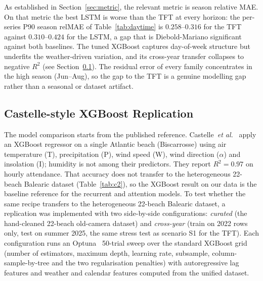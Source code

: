 \documentclass[twocolumn,twoside,a4paper,10pt]{IEEEtran}
\begin{document}
As established in Section~\ref{sec:metric}, the relevant metric is season relative MAE. On that metric the best LSTM is worse than the TFT at every horizon: the per-series P90 season relMAE of Table~\ref{tab:daytime} is $0.258$--$0.316$ for the TFT against $0.310$--$0.424$ for the LSTM, a gap that is Diebold-Mariano significant against both baselines. The tuned XGBoost captures day-of-week structure but underfits the weather-driven variation, and its cross-year transfer collapses to negative $R^2$ (see Section~\ref{sec:c2}). The residual error of every family concentrates in the high season (Jun--Aug), so the gap to the TFT is a genuine modelling gap rather than a seasonal or dataset artifact.

\subsection{Castelle-style XGBoost Replication}\label{sec:c2}

The model comparison starts from the published reference. Castelle~\emph{et al.}~\cite{Castelle2025} apply an XGBoost regressor on a single Atlantic beach (Biscarrosse) using air temperature (T), precipitation (P), wind speed (W), wind direction ($\alpha$) and insolation (I); humidity is not among their predictors. They report $R^2 = 0.97$ on hourly attendance. That accuracy does not transfer to the heterogeneous 22-beach Balearic dataset (Table~\ref{tab:c2}), so the XGBoost result on our data is the baseline reference for the recurrent and attention models. To test whether the same recipe transfers to the heterogeneous 22-beach Balearic dataset, a replication was implemented with two side-by-side configurations: \emph{curated} (the hand-cleaned 22-beach old-camera dataset) and \emph{cross-year} (train on 2022 rows only, test on summer 2025, the same stress test as scenario S1 for the TFT). Each configuration runs an Optuna~\cite{Akiba2019Optuna} 50-trial sweep over the standard XGBoost grid (number of estimators, maximum depth, learning rate, subsample, column-sample-by-tree and the two regularisation penalties) with autoregressive lag features and weather and calendar features computed from the unified dataset.
\end{document}
